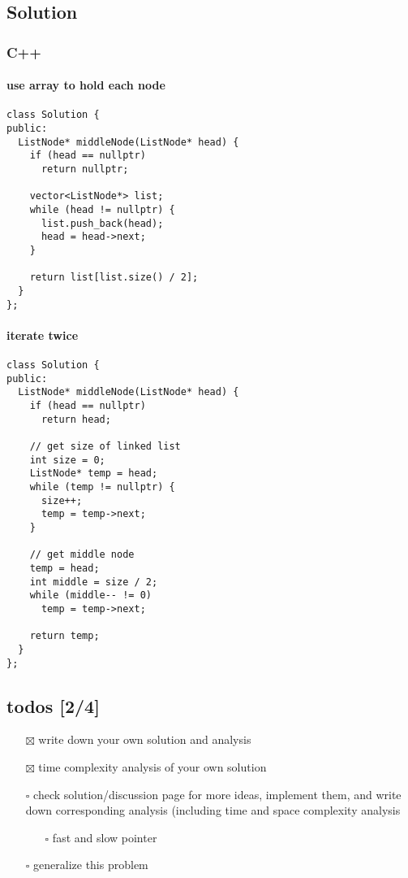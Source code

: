 \documentclass[12pt]{article}
\begin{document}
\subsection{Solution}
\label{sec:org79d8699}
\subsubsection{C++}
\label{sec:orgfba17e6}
\paragraph{use array to hold each node}
\label{sec:org1f0ab4b}
\begin{verbatim}
class Solution {
public:
  ListNode* middleNode(ListNode* head) {
    if (head == nullptr)
      return nullptr;

    vector<ListNode*> list;
    while (head != nullptr) {
      list.push_back(head);
      head = head->next;
    }

    return list[list.size() / 2];
  }
};
\end{verbatim}
\paragraph{iterate twice}
\label{sec:org38d37fc}
\begin{verbatim}
class Solution {
public:
  ListNode* middleNode(ListNode* head) {
    if (head == nullptr)
      return head;

    // get size of linked list
    int size = 0;
    ListNode* temp = head;
    while (temp != nullptr) {
      size++;
      temp = temp->next;
    }

    // get middle node
    temp = head;
    int middle = size / 2;
    while (middle-- != 0)
      temp = temp->next;

    return temp;
  }
};
\end{verbatim}
\subsection{todos [2/4]}
\label{sec:orgeb2e6c0}
\begin{itemize}
\item[{$\boxtimes$}] write down your own solution and analysis
\item[{$\boxtimes$}] time complexity analysis of your own solution
\item[{$\square$}] check solution/discussion page for more ideas, implement them, and write down corresponding analysis (including time and space complexity analysis
\begin{itemize}
\item[{$\square$}] fast and slow pointer
\end{itemize}
\item[{$\square$}] generalize this problem
\end{itemize}
\end{document}
